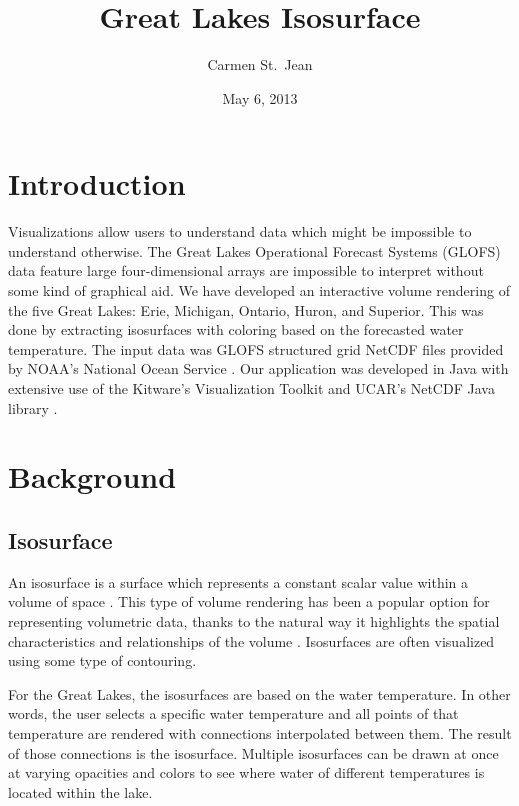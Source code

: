 \documentclass{article} %
\begin{document}

\title{Great Lakes Isosurface}
\date{May 6, 2013}
\author{Carmen St.\ Jean}


\maketitle

\section{Introduction}

Visualizations allow users to understand data which might be impossible to understand otherwise.  The Great Lakes Operational Forecast Systems (GLOFS) data feature large four-dimensional arrays are impossible to interpret without some kind of graphical aid.  We have developed an interactive volume rendering of the five Great Lakes: Erie, Michigan, Ontario, Huron, and Superior.  This was done by extracting isosurfaces with coloring based on the forecasted water temperature.  The input data was GLOFS structured grid NetCDF files provided by NOAA's National Ocean Service \cite{glofs}.  Our application was developed in Java with extensive use of the Kitware's Visualization Toolkit \cite{vtk} and UCAR's NetCDF Java library \cite{netcdf}.

\section{Background}

\subsection{Isosurface}

An isosurface is a surface which represents a constant scalar value within a volume of space \cite[p. 803] {vtkGuide}.  This type of volume rendering has been a popular option for representing volumetric data, thanks to the natural way it highlights the spatial characteristics and relationships of the volume \cite{meissnerVolume}.  Isosurfaces are often visualized using some type of contouring.

For the Great Lakes, the isosurfaces are based on the water temperature.  In other words, the user selects a specific water temperature and all points of that temperature are rendered with connections interpolated between them.  The result of those connections is the isosurface.  Multiple isosurfaces can be drawn at once at varying opacities and colors to see where water of different temperatures is located within the lake.
\end{document}
